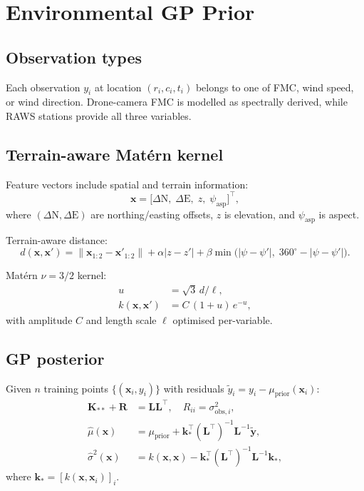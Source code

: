 \documentclass[11pt,twocolumn]{article}
\newcommand{\norm}[1]{\left\lVert#1\right\rVert}
\begin{document}
\section{Environmental GP Prior}
\label{sec:gp}

\subsection{Observation types}

Each observation $y_i$ at location $(r_i,c_i,t_i)$ belongs to one of
FMC, wind speed, or wind direction.  Drone-camera FMC is modelled as
spectrally derived, while RAWS stations provide all three variables.

\subsection{Terrain-aware Mat\'{e}rn kernel}

Feature vectors include spatial and terrain information:
\begin{equation}
  \mathbf{x} = \bigl[\Delta\text{N},\;\Delta\text{E},\;
                z,\;\psi_{\mathrm{asp}}\bigr]^\top,
\end{equation}
where $(\Delta\text{N},\Delta\text{E})$ are northing/easting offsets,
$z$ is elevation, and $\psi_{\mathrm{asp}}$ is aspect.

Terrain-aware distance:
\begin{equation}
  d(\mathbf{x},\mathbf{x}') =
    \norm{\mathbf{x}_{1:2}-\mathbf{x}'_{1:2}}
    + \alpha|z-z'|
    + \beta\min\!\bigl(|\psi-\psi'|,\;360^\circ-|\psi-\psi'|\bigr).
  \label{eq:tdist}
\end{equation}

Mat\'{e}rn $\nu=3/2$ kernel:
\begin{align}
  u &= \sqrt{3}\,d/\ell,\label{eq:matern_u}\\
  k(\mathbf{x},\mathbf{x}') &= C\,(1+u)\,e^{-u},\label{eq:matern}
\end{align}
with amplitude $C$ and length scale $\ell$ optimised per-variable.

\subsection{GP posterior}

Given $n$ training points $\{(\mathbf{x}_i,y_i)\}$ with residuals
$\tilde{y}_i = y_i - \mu_{\mathrm{prior}}(\mathbf{x}_i)$:
\begin{align}
  \mathbf{K}_{**} + \mathbf{R} &= \mathbf{L}\mathbf{L}^\top,\quad
    R_{ii} = \sigma_{\mathrm{obs},i}^2,\label{eq:chol}\\
  \hat{\mu}(\mathbf{x}) &= \mu_{\mathrm{prior}} +
    \mathbf{k}_*^\top(\mathbf{L}^\top)^{-1}\mathbf{L}^{-1}\tilde{\mathbf{y}},\label{eq:gpmean}\\
  \hat{\sigma}^2(\mathbf{x}) &= k(\mathbf{x},\mathbf{x}) -
    \mathbf{k}_*^\top(\mathbf{L}^\top)^{-1}\mathbf{L}^{-1}\mathbf{k}_*,\label{eq:gpvar}
\end{align}
where $\mathbf{k}_* = [k(\mathbf{x},\mathbf{x}_i)]_i$.
\end{document}

